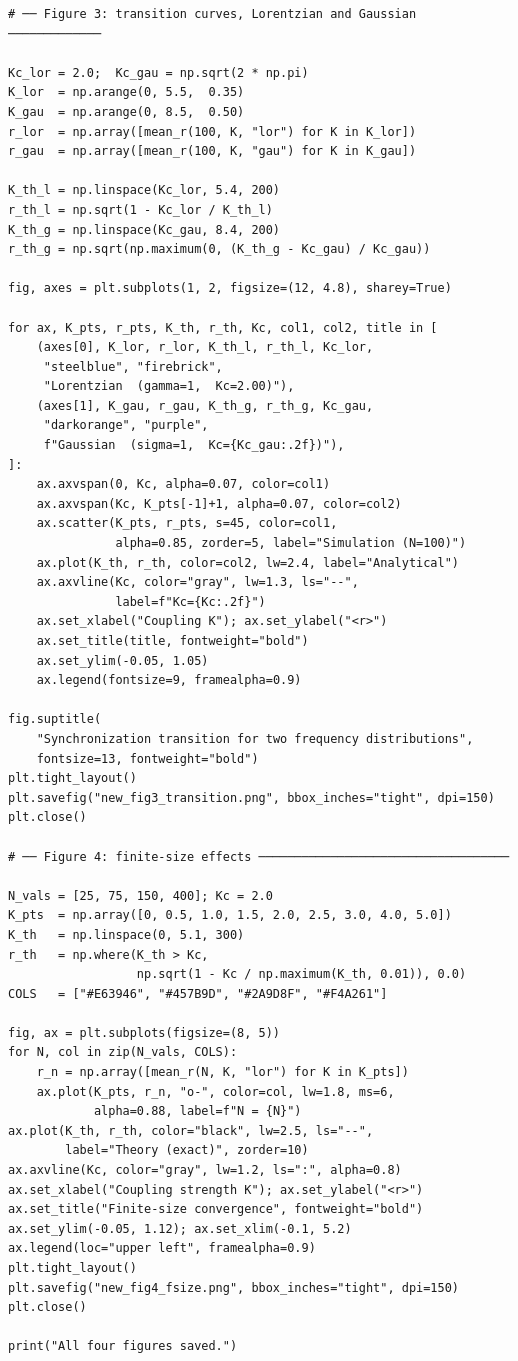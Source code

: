 \documentclass[12pt,a4paper]{article}
\begin{document}
\begin{lstlisting}[caption={%
  Complete Kuramoto simulation code. Generates all four figures.},
  label={lst:main}]
# ── Figure 3: transition curves, Lorentzian and Gaussian ─────────────

Kc_lor = 2.0;  Kc_gau = np.sqrt(2 * np.pi)
K_lor  = np.arange(0, 5.5,  0.35)
K_gau  = np.arange(0, 8.5,  0.50)
r_lor  = np.array([mean_r(100, K, "lor") for K in K_lor])
r_gau  = np.array([mean_r(100, K, "gau") for K in K_gau])

K_th_l = np.linspace(Kc_lor, 5.4, 200)
r_th_l = np.sqrt(1 - Kc_lor / K_th_l)
K_th_g = np.linspace(Kc_gau, 8.4, 200)
r_th_g = np.sqrt(np.maximum(0, (K_th_g - Kc_gau) / Kc_gau))

fig, axes = plt.subplots(1, 2, figsize=(12, 4.8), sharey=True)

for ax, K_pts, r_pts, K_th, r_th, Kc, col1, col2, title in [
    (axes[0], K_lor, r_lor, K_th_l, r_th_l, Kc_lor,
     "steelblue", "firebrick",
     "Lorentzian  (gamma=1,  Kc=2.00)"),
    (axes[1], K_gau, r_gau, K_th_g, r_th_g, Kc_gau,
     "darkorange", "purple",
     f"Gaussian  (sigma=1,  Kc={Kc_gau:.2f})"),
]:
    ax.axvspan(0, Kc, alpha=0.07, color=col1)
    ax.axvspan(Kc, K_pts[-1]+1, alpha=0.07, color=col2)
    ax.scatter(K_pts, r_pts, s=45, color=col1,
               alpha=0.85, zorder=5, label="Simulation (N=100)")
    ax.plot(K_th, r_th, color=col2, lw=2.4, label="Analytical")
    ax.axvline(Kc, color="gray", lw=1.3, ls="--",
               label=f"Kc={Kc:.2f}")
    ax.set_xlabel("Coupling K"); ax.set_ylabel("<r>")
    ax.set_title(title, fontweight="bold")
    ax.set_ylim(-0.05, 1.05)
    ax.legend(fontsize=9, framealpha=0.9)

fig.suptitle(
    "Synchronization transition for two frequency distributions",
    fontsize=13, fontweight="bold")
plt.tight_layout()
plt.savefig("new_fig3_transition.png", bbox_inches="tight", dpi=150)
plt.close()

# ── Figure 4: finite-size effects ───────────────────────────────────

N_vals = [25, 75, 150, 400]; Kc = 2.0
K_pts  = np.array([0, 0.5, 1.0, 1.5, 2.0, 2.5, 3.0, 4.0, 5.0])
K_th   = np.linspace(0, 5.1, 300)
r_th   = np.where(K_th > Kc,
                  np.sqrt(1 - Kc / np.maximum(K_th, 0.01)), 0.0)
COLS   = ["#E63946", "#457B9D", "#2A9D8F", "#F4A261"]

fig, ax = plt.subplots(figsize=(8, 5))
for N, col in zip(N_vals, COLS):
    r_n = np.array([mean_r(N, K, "lor") for K in K_pts])
    ax.plot(K_pts, r_n, "o-", color=col, lw=1.8, ms=6,
            alpha=0.88, label=f"N = {N}")
ax.plot(K_th, r_th, color="black", lw=2.5, ls="--",
        label="Theory (exact)", zorder=10)
ax.axvline(Kc, color="gray", lw=1.2, ls=":", alpha=0.8)
ax.set_xlabel("Coupling strength K"); ax.set_ylabel("<r>")
ax.set_title("Finite-size convergence", fontweight="bold")
ax.set_ylim(-0.05, 1.12); ax.set_xlim(-0.1, 5.2)
ax.legend(loc="upper left", framealpha=0.9)
plt.tight_layout()
plt.savefig("new_fig4_fsize.png", bbox_inches="tight", dpi=150)
plt.close()

print("All four figures saved.")
\end{lstlisting}
\end{document}
